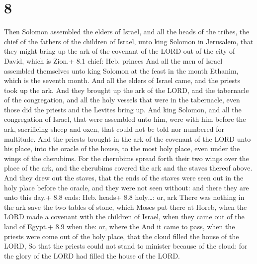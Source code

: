 \hypertarget{section-7}{%
\section{8}\label{section-7}}

 Then Solomon assembled the elders of Israel, and all the
heads of the tribes, the chief of the fathers of the children of Israel,
unto king Solomon in Jerusalem, that they might bring up the ark of the
covenant of the LORD out of the city of David, which is Zion.+ 8.1
chief: Heb. princes  And all the men of Israel assembled
themselves unto king Solomon at the feast in the month Ethanim, which is
the seventh month.  And all the elders of Israel came, and
the priests took up the ark.  And they brought up the ark of
the LORD, and the tabernacle of the congregation, and all the holy
vessels that were in the tabernacle, even those did the priests and the
Levites bring up.  And king Solomon, and all the
congregation of Israel, that were assembled unto him, were with him
before the ark, sacrificing sheep and oxen, that could not be told nor
numbered for multitude.  And the priests brought in the ark
of the covenant of the LORD unto his place, into the oracle of the
house, to the most holy place, even under the wings of the cherubims.
 For the cherubims spread forth their two wings over the
place of the ark, and the cherubims covered the ark and the staves
thereof above.  And they drew out the staves, that the ends
of the staves were seen out in the holy place before the oracle, and
they were not seen without: and there they are unto this day.+ 8.8 ends:
Heb. heads+ 8.8 holy\ldots: or, ark  There was nothing in
the ark save the two tables of stone, which Moses put there at Horeb,
when the LORD made a covenant with the children of Israel, when they
came out of the land of Egypt.+ 8.9 when the: or, where the
 And it came to pass, when the priests were come out of the
holy place, that the cloud filled the house of the LORD, 
So that the priests could not stand to minister because of the cloud:
for the glory of the LORD had filled the house of the LORD.

